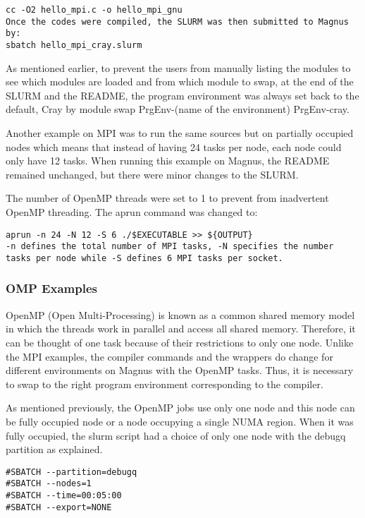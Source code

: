 \documentclass[journal]{IEEEtran}
\begin{document}
{\begin{verbatim}
cc -O2 hello_mpi.c -o hello_mpi_gnu
Once the codes were compiled, the SLURM was then submitted to Magnus by:
sbatch hello_mpi_cray.slurm 
\end{verbatim}

As mentioned earlier, to prevent the users from manually listing the modules to see which modules are loaded and from which module to swap, at the end
of the SLURM and the README, the program environment was always set back to the default, Cray by module swap PrgEnv-(name of the environment) PrgEnv-cray.

Another example on MPI was to run the same sources but on partially occupied nodes which means that instead of having 24 tasks per node, each node could
only have 12 tasks. When running this example on Magnus, the README remained unchanged, but there were minor changes to the SLURM.

The number of OpenMP threads were set to 1 to prevent from inadvertent OpenMP threading. The aprun command was changed to:

\begin{verbatim}
aprun -n 24 -N 12 -S 6 ./$EXECUTABLE >> ${OUTPUT}
-n defines the total number of MPI tasks, -N specifies the number tasks per node while -S defines 6 MPI tasks per socket.
\end{verbatim}

\subsubsection{OMP Examples}

OpenMP (Open Multi-Processing) is known as a common shared memory model in which the threads work in parallel and access all shared memory. Therefore,
it can be thought of one task because of their restrictions to only one node. Unlike the MPI examples, the compiler commands and the wrappers do change 
for different environments on Magnus with the OpenMP tasks. Thus, it is necessary to swap to the right program environment corresponding to the compiler.

As mentioned previously, the OpenMP jobs use only one node and this node can be fully occupied node or a node occupying a single NUMA region. When it was 
fully occupied, the slurm script had a choice of only one node with the debugq partition as explained.

\begin{verbatim}
#SBATCH --partition=debugq
#SBATCH --nodes=1
#SBATCH --time=00:05:00
#SBATCH --export=NONE
\end{verbatim}

}
\end{document}
